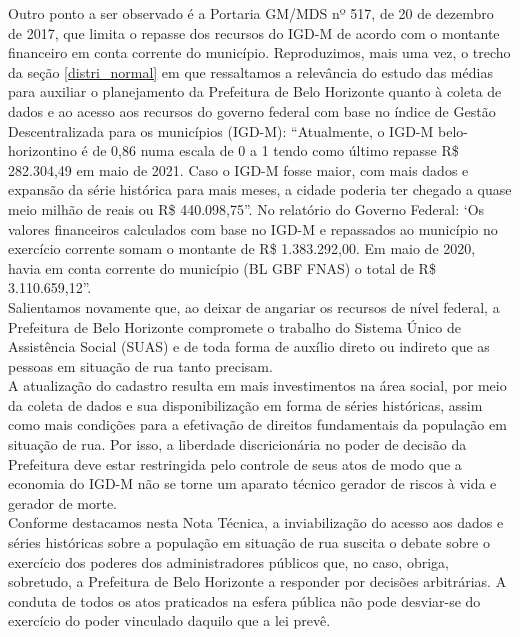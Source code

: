 \documentclass[12pt]{article}
\begin{document}
Outro ponto a ser observado é a Portaria GM/MDS nº 517, de 20 de dezembro de 2017, que limita o repasse dos recursos do IGD-M de acordo com o montante financeiro em conta corrente do município. Reproduzimos, mais uma vez, o trecho da seção \ref{distri_normal} em que ressaltamos a relevância do estudo das médias para auxiliar o planejamento da Prefeitura de Belo Horizonte quanto à coleta de dados e ao acesso aos recursos do governo federal com base no índice de Gestão Descentralizada para os municípios (IGD-M): ``Atualmente, o IGD-M belo-horizontino é de 0,86 numa escala de 0 a 1 tendo como último repasse R\$ 282.304,49 em maio de 2021. Caso o IGD-M fosse maior, com mais dados e expansão da série histórica para mais meses, a cidade poderia ter chegado a quase meio milhão de reais ou R\$ 440.098,75”. No relatório do Governo Federal: `Os valores financeiros calculados com base no IGD-M e repassados ao município no exercício corrente somam o montante de R\$ 1.383.292,00. Em maio de 2020, havia em conta corrente do município (BL GBF FNAS) o total de R\$ 3.110.659,12”.\\

Salientamos novamente que, ao deixar de angariar os recursos de nível federal, a Prefeitura de Belo Horizonte compromete o trabalho do Sistema Único de Assistência Social (SUAS) e de toda forma de auxílio direto ou indireto que as pessoas em situação de rua tanto precisam.\\ 

A atualização do cadastro resulta em mais investimentos na área social, por meio da coleta de dados e sua disponibilização em forma de séries históricas, assim como mais condições para a efetivação de direitos fundamentais da população em situação de rua. Por isso, a liberdade discricionária no poder de decisão da Prefeitura deve estar restringida pelo controle de seus atos de modo que a economia do IGD-M não se torne um aparato técnico gerador de riscos à vida e gerador de morte.\\

Conforme destacamos nesta Nota Técnica, a inviabilização do acesso aos dados e séries históricas sobre a população em situação de rua suscita o debate sobre o exercício dos poderes dos administradores públicos que, no caso, obriga, sobretudo, a Prefeitura de Belo Horizonte a responder por decisões arbitrárias. A conduta de todos os atos praticados na esfera pública não pode desviar-se do exercício do poder vinculado daquilo que a lei prevê.\\ 
\end{document}
